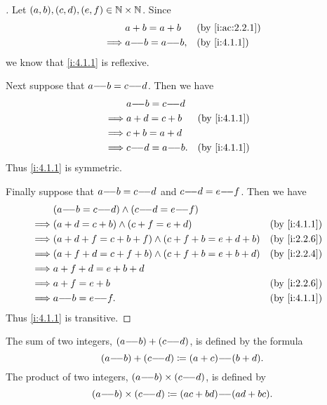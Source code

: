 \begin{proof}[]
  Let \((a, b), (c, d), (e, f) \in \mathbb{N} \times \mathbb{N}\).
  Since
  \begin{align*}
             & a + b = a + b      &  & \by{i:ac:2.2.1} \\
    \implies & a \mm b = a \mm b, &  & \by{i:4.1.1}
  \end{align*}
  we know that \cref{i:4.1.1} is reflexive.

  Next suppose that \(a {-}\!{-} b = c {-}\!{-} d\).
  Then we have
  \begin{align*}
             & a \mm b = c \mm d                    \\
    \implies & a + d = c + b      &  & \by{i:4.1.1} \\
    \implies & c + b = a + d                        \\
    \implies & c \mm d = a \mm b. &  & \by{i:4.1.1}
  \end{align*}
  Thus \cref{i:4.1.1} is symmetric.

  Finally suppose that \(a {-}\!{-} b = c {-}\!{-} d\) and \(c {-}\!{-} d = e {-}\!{-} f\).
  Then we have
  \begin{align*}
             & (a \mm b = c \mm d) \land (c \mm d = e \mm f)                           \\
    \implies & (a + d = c + b) \land (c + f = e + d)                 &  & \by{i:4.1.1} \\
    \implies & (a + d + f = c + b + f) \land (c + f + b = e + d + b) &  & \by{i:2.2.6} \\
    \implies & (a + f + d = c + f + b) \land (c + f + b = e + b + d) &  & \by{i:2.2.4} \\
    \implies & a + f + d = e + b + d                                                   \\
    \implies & a + f = e + b                                         &  & \by{i:2.2.6} \\
    \implies & a \mm b = e \mm f.                                    &  & \by{i:4.1.1}
  \end{align*}
  Thus \cref{i:4.1.1} is transitive.
\end{proof}

\begin{defn}\label{i:4.1.2}
  The sum of two integers, \((a {-}\!{-} b) + (c {-}\!{-} d)\), is defined by the formula
  \[
    (a {-}\!{-} b) + (c {-}\!{-} d) \coloneqq (a + c) {-}\!{-} (b + d).
  \]
  The product of two integers, \((a {-}\!{-} b) \times (c {-}\!{-} d)\), is defined by
  \[
    (a {-}\!{-} b) \times (c {-}\!{-} d) \coloneqq (ac + bd) {-}\!{-} (ad + bc).
  \]
\end{defn}


